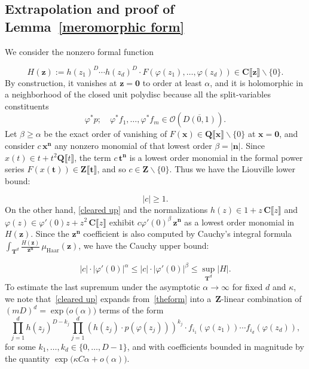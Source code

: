 \documentclass[10pt]{amsart}
\renewcommand\setminus{\smallsetminus}
\def\T{\mathbf{T}}
\def\Z{\mathbf{Z}}
\def\Q{\mathbf{Q}}
\theoremstyle{remark}
\numberwithin{equation}{subsection}
\def\numequation{\addtocounter{subsubsection}{1}\begin{equation}}
\def\C{\mathbf{C}}
\begin{document}
\subsection{Extrapolation and proof of Lemma~\ref{meromorphic form}} \label{extrapolate}
We consider the nonzero formal function
\numequation \label{cleared up}
H(\mathbf{z}) := h(z_1)^D \cdots h(z_d)^D \cdot F(\varphi(z_1), \ldots, \varphi(z_d)) \in  \C \llbracket \mathbf{z} 
\rrbracket \setminus \{0\}.
\end{equation}
By construction, it vanishes at $\mathbf{z=0}$ to order at least $\alpha$, and it is holomorphic in a neighborhood of the closed unit polydisc because all the split-variables constituents 
$$
\varphi^*p; \quad  \varphi^* f_1, \ldots, \varphi^* f_m \in {\mathcal{O}(\overline{D(0,1)})}.
$$
Let $\beta \geq \alpha$ be the exact order of vanishing of $F(\mathbf{x}) \in \Q \llbracket \mathbf{x} \rrbracket \setminus \{0\}$ at $\mathbf{x=0}$, and consider $c \, \mathbf{x^n}$ any nonzero monomial of that lowest order $\beta = |\mathbf{n}|$. Since $x(t) \in t + t^2 \Q\llbracket t \rrbracket$, the term $c \, \mathbf{t^n}$ is a lowest order monomial in the formal power series   $F(x(\mathbf{t})) \in \Z \llbracket \mathbf{t} \rrbracket$, and so $c \in \Z \setminus \{0\}$. Thus  we have the Liouville lower bound: 
\numequation \label{LLB}
|c| \geq 1.
\end{equation}
On the other hand, \eqref{cleared up} and the normalizations $h(z) \in 1 + z\, \C \llbracket z \rrbracket$  and $\varphi(z) \in \varphi'(0) z + z^2 \, \C \llbracket z \rrbracket$ exhibit $c \varphi'(0)^{\beta} \, \mathbf{z^n}$ as  a lowest order monomial in $H(\mathbf{z})$. Since the $\mathbf{z^n}$ coefficient is also computed by Cauchy's integral formula $  \int_{\T^d} \frac{ H(\mathbf{z}) }{ \mathbf{z^n}  } \, \mu_{\mathrm{Haar}}(\mathbf{z})$, we have the Cauchy upper bound: 
\numequation \label{CUP}
|c| \cdot |\varphi'(0)|^{\alpha}    \leq |c| \cdot |\varphi'(0)|^{\beta} \leq \sup_{\T^d} |H|. 
\end{equation}
To estimate the last supremum under the asymptotic $\alpha \to \infty$ for  fixed $d$ and $\kappa$, we note that~\eqref{cleared up} expands from~\eqref{theform}
into a~$\Z$-linear combination of $(mD)^d = \exp\big( o(\alpha) \big)$ terms of the form
$$
 \prod_{j=1}^{d} h(z_j)^{D-k_j} \prod_{j=1}^{d} (h(z_j)  \cdot  p(\varphi(z_j)) )^{k_j} \cdot f_{i_1}(\varphi(z_1)) \cdots 
f_{i_d}(\varphi(z_d)),
$$
for some $k_1, \ldots, k_d \in \{0,\ldots,D-1\}$, and with coefficients bounded in magnitude by
the quantity $\exp \big( \kappa C \alpha + o(\alpha)  \big)$.
\end{document}
